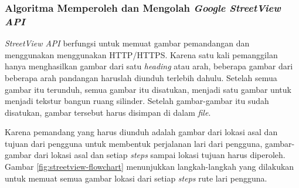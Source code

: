 \subsubsection{Algoritma Memperoleh dan Mengolah \textit{Google StreetView API}} 
\textit{StreetView API} berfungsi untuk memuat gambar pemandangan dan menggunakan menggunakan HTTP/HTTPS. Karena satu kali pemanggilan hanya menghasilkan gambar dari satu \textit{heading} atau arah, beberapa gambar dari beberapa arah pandangan haruslah diunduh terlebih dahulu. Setelah semua gambar itu terunduh, semua gambar itu disatukan, menjadi satu gambar untuk menjadi tekstur bangun ruang silinder. Setelah gambar-gambar itu sudah disatukan, gambar tersebut harus disimpan di dalam \textit{file}.

Karena pemandang yang harus diunduh adalah gambar dari lokasi asal dan tujuan dari pengguna untuk membentuk perjalanan lari dari pengguna, gambar-gambar dari lokasi asal dan setiap \textit{steps} sampai lokasi tujuan harus diperoleh. Gambar \ref{fig:streetview-flowchart} menunjukkan langkah-langkah yang dilakukan untuk memuat semua gambar lokasi dari setiap \textit{steps} rute lari pengguna.
	
